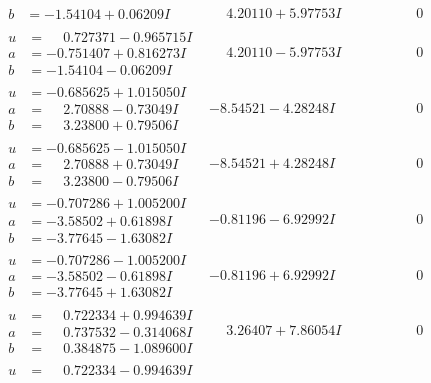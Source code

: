 \documentclass[1p]{elsarticle_modified}
\theoremstyle{definition}
\begin{document}
$$\begin{array}{c|c|c}
\begin{aligned}
b &= -1.54104 + 0.06209 I\end{aligned}
 & \phantom{-}4.20110 + 5.97753 I & \phantom{-0.000000 } 0 \\ \hline\begin{aligned}
u &= \phantom{-}0.727371 - 0.965715 I \\
a &= -0.751407 + 0.816273 I \\
b &= -1.54104 - 0.06209 I\end{aligned}
 & \phantom{-}4.20110 - 5.97753 I & \phantom{-0.000000 } 0 \\ \hline\begin{aligned}
u &= -0.685625 + 1.015050 I \\
a &= \phantom{-}2.70888 - 0.73049 I \\
b &= \phantom{-}3.23800 + 0.79506 I\end{aligned}
 & -8.54521 - 4.28248 I & \phantom{-0.000000 } 0 \\ \hline\begin{aligned}
u &= -0.685625 - 1.015050 I \\
a &= \phantom{-}2.70888 + 0.73049 I \\
b &= \phantom{-}3.23800 - 0.79506 I\end{aligned}
 & -8.54521 + 4.28248 I & \phantom{-0.000000 } 0 \\ \hline\begin{aligned}
u &= -0.707286 + 1.005200 I \\
a &= -3.58502 + 0.61898 I \\
b &= -3.77645 - 1.63082 I\end{aligned}
 & -0.81196 - 6.92992 I & \phantom{-0.000000 } 0 \\ \hline\begin{aligned}
u &= -0.707286 - 1.005200 I \\
a &= -3.58502 - 0.61898 I \\
b &= -3.77645 + 1.63082 I\end{aligned}
 & -0.81196 + 6.92992 I & \phantom{-0.000000 } 0 \\ \hline\begin{aligned}
u &= \phantom{-}0.722334 + 0.994639 I \\
a &= \phantom{-}0.737532 - 0.314068 I \\
b &= \phantom{-}0.384875 - 1.089600 I\end{aligned}
 & \phantom{-}3.26407 + 7.86054 I & \phantom{-0.000000 } 0 \\ \hline\begin{aligned}
u &= \phantom{-}0.722334 - 0.994639 I \\

\end{aligned}
\end{array}$$
\end{document}
